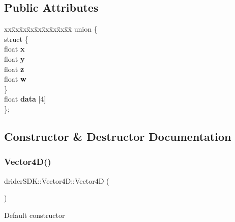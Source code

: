 \subsection*{Public Attributes}
\begin{DoxyCompactItemize}
\item 
\mbox{\label{classdrider_s_d_k_1_1_vector4_d_a3c6a9cbc294493a04d0cef1aa6d0eb2e}} 
\begin{tabbing}
xx\=xx\=xx\=xx\=xx\=xx\=xx\=xx\=xx\=\kill
union \{\\
\mbox{\label{uniondrider_s_d_k_1_1_vector4_d_1_1_0D24_a60fc399dd2e2b657c951b09a4104884d}} 
\>struct \{\\
\>\>float {\bfseries x}\\
\>\>float {\bfseries y}\\
\>\>float {\bfseries z}\\
\>\>float {\bfseries w}\\
\>\} \\
\>float {\bfseries data} \mbox{[}4\mbox{]}\\
\}; \\

\end{tabbing}\end{DoxyCompactItemize}


\subsection{Constructor \& Destructor Documentation}
\mbox{\label{classdrider_s_d_k_1_1_vector4_d_af010e3865425352f4ab21df1144cffcf}} 
\subsubsection{\texorpdfstring{Vector4\+D()}{Vector4D()}\hspace{0.1cm}{\footnotesize\ttfamily [1/5]}}
{\footnotesize\ttfamily drider\+S\+D\+K\+::\+Vector4\+D\+::\+Vector4D (\begin{DoxyParamCaption}{ }\end{DoxyParamCaption})}

Default constructor \mbox{\label{classdrider_s_d_k_1_1_vector4_d_aeff81eebdc91a9adfb959a66767a6281}} 
